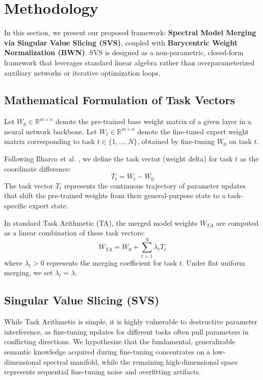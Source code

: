 \section{Methodology}
\label{sec:method}

In this section, we present our proposed framework: \textbf{Spectral Model Merging via Singular Value Slicing (SVS)}, coupled with \textbf{Barycentric Weight Normalization (BWN)}. SVS is designed as a non-parametric, closed-form framework that leverages standard linear algebra rather than overparameterized auxiliary networks or iterative optimization loops.

\subsection{Mathematical Formulation of Task Vectors}
Let $W_0 \in \mathbb{R}^{m \times n}$ denote the pre-trained base weight matrix of a given layer in a neural network backbone. Let $W_t \in \mathbb{R}^{m \times n}$ denote the fine-tuned expert weight matrix corresponding to task $t \in \{1, \dots, N\}$, obtained by fine-tuning $W_0$ on task $t$.

Following Ilharco et al. \cite{ilharco2022editing}, we define the task vector (weight delta) for task $t$ as the coordinate difference:
\begin{equation}
    T_t = W_t - W_0
\end{equation}
The task vector $T_t$ represents the continuous trajectory of parameter updates that shift the pre-trained weights from their general-purpose state to a task-specific expert state.

In standard Task Arithmetic (TA), the merged model weights $W_{TA}$ are computed as a linear combination of these task vectors:
\begin{equation}
    W_{TA} = W_0 + \sum_{t=1}^N \lambda_t T_t
\end{equation}
where $\lambda_t > 0$ represents the merging coefficient for task $t$. Under flat uniform merging, we set $\lambda_t = \lambda$.

\subsection{Singular Value Slicing (SVS)}
While Task Arithmetic is simple, it is highly vulnerable to destructive parameter interference, as fine-tuning updates for different tasks often pull parameters in conflicting directions. We hypothesize that the fundamental, generalizable semantic knowledge acquired during fine-tuning concentrates on a low-dimensional spectral manifold, while the remaining high-dimensional space represents sequential fine-tuning noise and overfitting artifacts.

